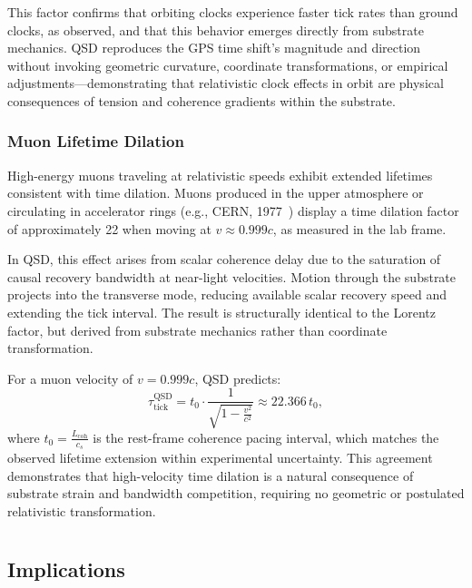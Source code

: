 \documentclass[entropy,article,submit,pdftex,moreauthors]{Definitions/mdpi}
\begin{document}
This factor confirms that orbiting clocks experience faster tick rates than ground clocks, as observed, and that this behavior emerges directly from substrate mechanics. QSD reproduces the GPS time shift's magnitude and direction without invoking geometric curvature, coordinate transformations, or empirical adjustments—demonstrating that relativistic clock effects in orbit are physical consequences of tension and coherence gradients within the substrate.

\subsubsection{Muon Lifetime Dilation}

High-energy muons traveling at relativistic speeds exhibit extended lifetimes consistent with time dilation. Muons produced in the upper atmosphere or circulating in accelerator rings (e.g., CERN, 1977~\cite{bailey-muon}) display a time dilation factor of approximately 22 when moving at \( v \approx 0.999c \), as measured in the lab frame.

In QSD, this effect arises from scalar coherence delay due to the saturation of causal recovery bandwidth at near-light velocities. Motion through the substrate projects into the transverse mode, reducing available scalar recovery speed and extending the tick interval. The result is structurally identical to the Lorentz factor, but derived from substrate mechanics rather than coordinate transformation.

For a muon velocity of \( v = 0.999c \), QSD predicts:
\[
\tau_{\text{tick}}^{\text{QSD}} = t_0 \cdot \frac{1}{\sqrt{1 - \frac{v^2}{c^2}}} \approx 22.366 \, t_0,
\]
where \( t_0 = \frac{L_{\text{coh}}}{c_s} \) is the rest-frame coherence pacing interval, which matches the observed lifetime extension within experimental uncertainty. This agreement demonstrates that high-velocity time dilation is a natural consequence of substrate strain and bandwidth competition, requiring no geometric or postulated relativistic transformation.

\section[\appendixname~\thesection]{}
\subsection[\appendixname~\thesubsection]{Implications}
\end{document}
